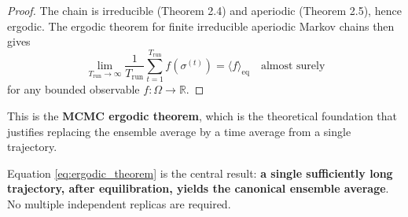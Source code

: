 \documentclass[12pt, a4paper]{article}
\theoremstyle{definition}
\newcommand{\COH}{C_\mathrm{OH}^B}
\begin{document}
\begin{proof}
The chain is irreducible (Theorem 2.4) and aperiodic 
(Theorem 2.5), hence ergodic. The ergodic theorem for 
finite irreducible aperiodic Markov chains  
then gives
\[
    \lim_{T_{\mathrm{run}}\to\infty}
    \frac{1}{T_{\mathrm{run}}}
    \sum_{t=1}^{T_{\mathrm{run}}} f(\sigma^{(t)})
    = \langle f \rangle_{\mathrm{eq}}
    \quad \text{almost surely}
\]
for any bounded observable $f : \Omega \to \mathbb{R}$.
\end{proof}

This is the \textbf{MCMC ergodic theorem}, which is the theoretical
foundation that justifies replacing the ensemble average by a
time average from a single trajectory.

\begin{keyresult}
    Equation \eqref{eq:ergodic_theorem} is the central result:
    \textbf{a single sufficiently long trajectory, after equilibration,
    yields the canonical ensemble average}.
    No multiple independent replicas are required.
\end{keyresult}







\end{document}
